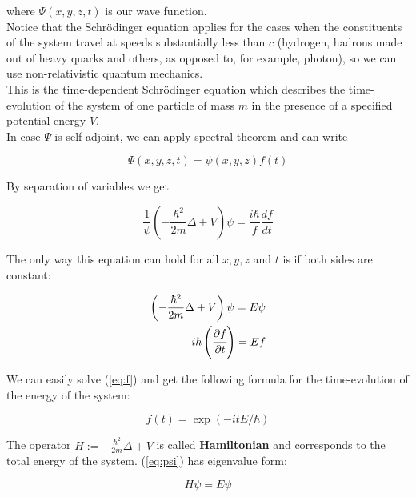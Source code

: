\documentclass[11pt, a4paper, german]{article}
\numberwithin{equation}{section}
\numberwithin{theorem}{section}
\begin{document}
where $\Psi(x,y,z,t)$ is our wave function.\\

Notice that the Schrödinger equation applies for the cases when the constituents of the system travel at speeds substantially less than $c$ (hydrogen, hadrons made out of heavy quarks and others, as opposed to, for example, photon), so we can use non-relativistic quantum mechanics.\\

This is the time-dependent Schrödinger equation which describes the time-evolution of the system of one particle of mass $m$ in the presence of a specified potential energy $V$.\\

In case $\Psi$ is self-adjoint, we can apply spectral theorem and can write

\begin{equation} \label{eq:wave-function-separation}
\Psi(x,y,z,t) = \psi(x,y,z) f(t)
\end{equation}

By separation of variables we get 

\begin{equation} \label{eq:schroedinger-after-separation}
\frac{1}{\psi}\left(- \frac{\hbar^2}{2m}\Delta + V\right)\psi = \frac{i\hbar}{f}\frac{df}{dt}
\end{equation}

The only way this equation can hold for all $x,y,z$ and $t$ is if both sides are constant:

\begin{align} 
\left(- \frac{\hbar^2}{2m}\Delta + V\right)\psi = E \psi \label{eq:psi}\\
i\hbar \left(\cfrac{\partial f}{\partial t} \right) = Ef \label{eq:f}
\end{align}

We can easily solve (\ref{eq:f}) and get the following formula for the time-evolution of the energy of the system: 

\begin{equation} \label{eq:time-evolution}
f(t) = \exp(-itE/\hbar)
\end{equation}

The operator $H:= - \frac{\hbar^2}{2m}\Delta + V$ is called \textbf{Hamiltonian} and corresponds to the total energy of the system. (\ref{eq:psi}) has eigenvalue form: 

\begin{equation} \label{eq:schroedinger-eigenvalue-form}
H\psi = E\psi
\end{equation}
\end{document}

